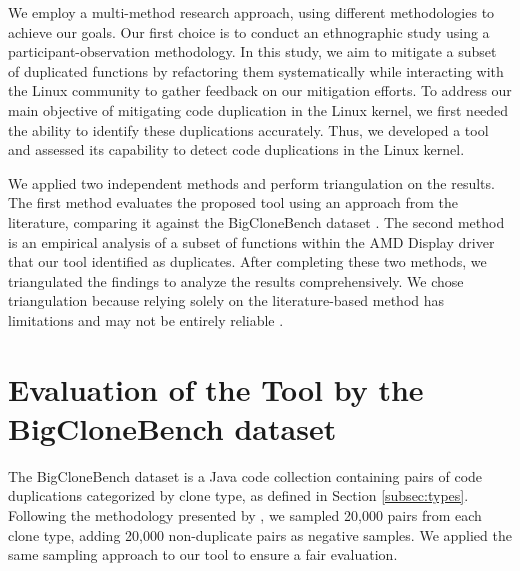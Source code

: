We employ a multi-method research approach, using different methodologies to achieve our goals. Our first choice is to conduct an ethnographic study using a participant-observation methodology. In this study, we aim to mitigate a subset of duplicated functions by refactoring them systematically while interacting with the Linux community to gather feedback on our mitigation efforts. To address our main objective of mitigating code duplication in the Linux kernel, we first needed the ability to identify these duplications accurately. Thus, we developed a tool and assessed its capability to detect code duplications in the Linux kernel.

We applied two independent methods and perform triangulation on the results. 
The first method evaluates the proposed tool using an approach from the literature, 
comparing it against the BigCloneBench dataset \citep{bigclonebench}. 
The second method is an empirical analysis of a subset of functions within the 
AMD Display driver that our tool identified as duplicates. After completing these two 
methods, we triangulated the findings to analyze the results comprehensively. 
We chose triangulation because relying solely on the literature-based method has 
limitations and may not be entirely reliable \citep{bigfail, litreview}.



\section{Evaluation of the Tool by the BigCloneBench dataset}

\label{sec:metbig}

The BigCloneBench dataset \citep{bigclonebench} is a Java code collection containing pairs of code duplications categorized by clone type, as defined in Section \ref{subsec:types}.
%
Following the methodology presented by \citep{tailor}, we sampled 20,000 pairs from each clone type, adding 20,000 non-duplicate pairs as negative samples. We applied the same sampling approach to our tool to ensure a fair evaluation.

